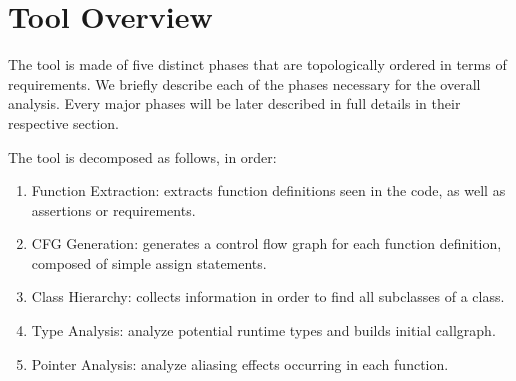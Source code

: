 \section{Tool Overview}
The tool is made of five distinct phases that are topologically ordered in terms
of requirements. We briefly describe each of the phases necessary for the
overall analysis. Every major phases will be later described in full details in
their respective section.

The tool is decomposed as follows, in order:
\begin{enumerate}
    \item{Function Extraction}: extracts function definitions seen in the code, as well as
    assertions or requirements.

    \item{CFG Generation}: generates a control flow graph for each function
    definition, composed of simple assign statements.

    \item{Class Hierarchy}: collects information in order to find all subclasses of a class.

    \item{Type Analysis}: analyze potential runtime types and builds initial callgraph.

    \item{Pointer Analysis}: analyze aliasing effects occurring in each function.
\end{enumerate}
